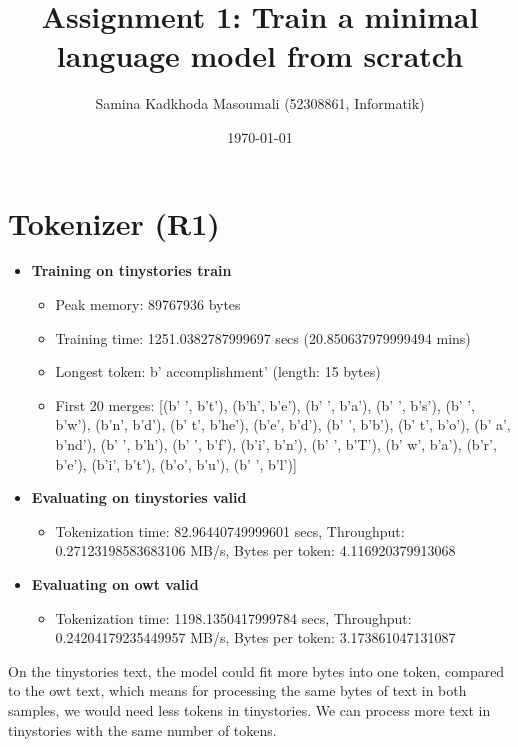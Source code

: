 \documentclass[11pt,a4paper]{article}
\title{Assignment 1: Train a minimal language model from scratch}
\author{Samina Kadkhoda Masoumali (52308861, Informatik)}
\date{\today}
\begin{document}
\maketitle

\section{Tokenizer (R1)}
\begin{itemize}
\item \textbf{Training on tinystories train}
    \begin{itemize}
    \item Peak memory: 89767936 bytes
    \item Training time: 1251.0382787999697 secs (20.850637979999494 mins)
    \item Longest token: b' accomplishment' (length: 15 bytes)
    \item First 20 merges: [(b' ', b't'), (b'h', b'e'), (b' ', b'a'), (b' ', b's'), (b' ', b'w'), (b'n', b'd'), (b' t', b'he'), (b'e', b'd'), (b' ', b'b'), (b' t', b'o'), (b' a', b'nd'), (b' ', b'h'), (b' ', b'f'), (b'i', b'n'), (b' ', b'T'), (b' w', b'a'), (b'r', b'e'), (b'i', b't'), (b'o', b'u'), (b' ', b'l')]
    \end{itemize}
    
\item \textbf{Evaluating on tinystories valid}
    \begin{itemize}
    \item Tokenization time: 82.96440749999601 secs, Throughput: 0.27123198583683106 MB/s, Bytes per token: 4.116920379913068
    \end{itemize}
\item \textbf{Evaluating on owt valid}
    \begin{itemize}
    \item Tokenization time: 1198.1350417999784 secs, Throughput: 0.24204179235449957 MB/s, Bytes per token: 3.173861047131087
    \end{itemize}
\end{itemize}

On the tinystories text, the model could fit more bytes into one token, compared to the owt text, which means for processing the same bytes of text in both samples, we would need less tokens in tinystories. We can process more text in tinystories with the same number of tokens.
\end{document}
